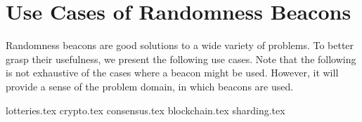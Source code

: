 \section{Use Cases of Randomness Beacons}\label{sec:use_cases_of_randomness_beacons}
Randomness beacons are good solutions to a wide variety of problems. To better grasp their usefulness, we present the following use cases. Note that the following is not exhaustive of the cases where a beacon might be used. However, it will provide a sense of the problem domain, in which beacons are used.

{lotteries.tex}
{crypto.tex}
{consensus.tex}
{blockchain.tex}
{sharding.tex}
